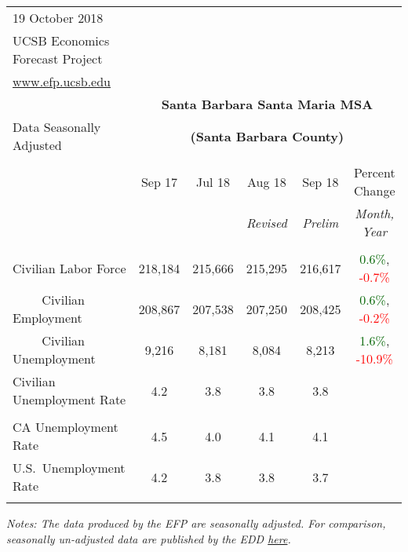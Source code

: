 \documentclass[12pt]{article}
\begin{document}
\begin{table}
\begin{tabular}{|l|c|c|c|c|c|}
\multicolumn{1}{l}{\small 19 October 2018} & \multicolumn{5}{c}{} \\
\multicolumn{1}{l}{\small UCSB Economics Forecast Project} & \multicolumn{5}{c}{} \\
\multicolumn{1}{l}{\small \href{http://www.efp.ucsb.edu/}{www.efp.ucsb.edu}} & \multicolumn{5}{c}{} \\
\multicolumn{1}{c}{} & \multicolumn{5}{c}{\large \textbf{Santa Barbara Santa Maria MSA}} \\
\multicolumn{1}{l}{\small Data Seasonally Adjusted} & \multicolumn{5}{c}{\small \textbf{(Santa Barbara County)}} \\ \hline \hline
& & & & & \\
 & Sep 17 & Jul 18 & Aug 18 & Sep 18 & Percent Change \\
 & & & \small \textit{Revised} & \small \textit{Prelim} & \small \textit{Month, Year} \\ \hline
& & & & & \\
Civilian Labor Force & 218,184 & 215,666 & 215,295 & 216,617 & \textcolor{darkgreen}{0.6\%}, \textcolor{red}{-0.7\%} \\
$\qquad$ \small Civilian Employment & 208,867 & 207,538 & 207,250 & 208,425 & \textcolor{darkgreen}{0.6\%}, \textcolor{red}{-0.2\%} \\
$\qquad$ \small Civilian Unemployment & 9,216 & 8,181 & 8,084 & 8,213 & \textcolor{darkgreen}{1.6\%}, \textcolor{red}{-10.9\%} \\
Civilian Unemployment Rate & 4.2 & 3.8 & 3.8 & 3.8 & \\
& & & & & \\
CA Unemployment Rate & 4.5 & 4.0 & 4.1 & 4.1 & \\
U.S.\ Unemployment Rate & 4.2 & 3.8 & 3.8 & 3.7 & \\
& & & & & \\ \hline \hline
\end{tabular}
\par
\vspace{.5em}
\footnotesize
\textit{Notes: The data produced by the EFP are seasonally adjusted. For comparison, seasonally un-adjusted data are published by the EDD \href{http://www.labormarketinfo.ca.gov/file/lfmonth/satb$pds.pdf}{here}.}
\end{table}
\end{document}
